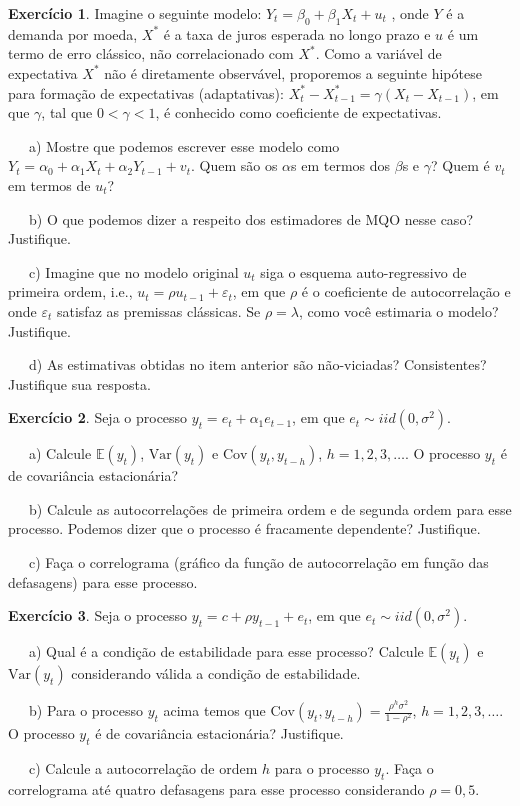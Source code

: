 \documentclass[
]{book}
\theoremstyle{definition}
\theoremstyle{definition}
\theoremstyle{definition}
\newtheorem{exercise}{Exercício}[chapter]
\theoremstyle{remark}
\begin{document}
\begin{exercise}
\protect\hypertarget{exr:exsr9}{}{\label{exr:exsr9} }Imagine o seguinte modelo: \(Y_t = \beta_0 + \beta_1 X_t + u_t\) , onde \(Y\) é a demanda por moeda, \(X^*\) é a taxa de juros esperada no longo prazo e \(u\) é um termo de erro clássico, não correlacionado com \(X^*\). Como a variável de expectativa \(X^*\) não é diretamente observável, proporemos a seguinte hipótese para formação de expectativas (adaptativas): \(X^*_t- X^*_{t-1} = \gamma(X_t- X_{t-1} )\), em que \(\gamma\), tal que \(0 < \gamma < 1\), é conhecido como coeficiente de expectativas.

~~~a) Mostre que podemos escrever esse modelo como \(Y_t=\alpha_0+\alpha_1X_t+\alpha_2Y_{t-1}+v_t\). Quem são os \(\alpha\)s em termos dos \(\beta\)s e \(\gamma\)? Quem é \(v_t\) em termos de \(u_t\)?

~~~b) O que podemos dizer a respeito dos estimadores de MQO nesse caso? Justifique.

~~~c) Imagine que no modelo original \(u_t\) siga o esquema auto-regressivo de primeira ordem, i.e., \(u_t = \rho u_{t-1} + \varepsilon_t\), em que \(\rho\) é o coeficiente de autocorrelação e onde \(\varepsilon_t\) satisfaz as premissas clássicas. Se \(\rho=\lambda\), como você estimaria o modelo? Justifique.

~~~d) As estimativas obtidas no item anterior são não-viciadas? Consistentes? Justifique sua resposta.
\end{exercise}

\begin{exercise}
\protect\hypertarget{exr:exsr10}{}{\label{exr:exsr10} }Seja o processo \(y_t = e_t + \alpha_1 e_{t-1}\), em que \(e_t \sim iid(0,\sigma^2).\)

~~~a) Calcule \(\mathbb{E}(y_t )\), \(\mbox{Var}(y_t )\) e \(\mbox{Cov}(y_t , y_{t-h} )\), \(h = 1, 2, 3,\ldots\). O processo \(y_t\) é de covariância estacionária?

~~~b) Calcule as autocorrelações de primeira ordem e de segunda ordem para esse processo. Podemos dizer que o processo é fracamente dependente? Justifique.

~~~c) Faça o correlograma (gráfico da função de autocorrelação em função das defasagens) para esse processo.
\end{exercise}

\begin{exercise}
\protect\hypertarget{exr:exsr11}{}{\label{exr:exsr11} }Seja o processo \(y_t = c + \rho y_{t-1} + e_t\), em que \(e_t \sim iid(0,\sigma^2)\).

~~~a) Qual é a condição de estabilidade para esse processo? Calcule \(\mathbb{E}(y_t )\) e \(\mbox{Var}(y_t )\) considerando válida a condição de estabilidade.

~~~b) Para o processo \(y_t\) acima temos que \(\mbox{Cov}(y_t,y_{t-h} ) = \frac{\rho^h\sigma^2}{1-\rho^2}\), \(h = 1, 2, 3,\ldots\). O processo \(y_t\) é de covariância estacionária? Justifique.

~~~c) Calcule a autocorrelação de ordem \(h\) para o processo \(y_t\). Faça o correlograma até quatro defasagens para esse processo considerando \(\rho = 0,5\).
\end{exercise}
\end{document}
